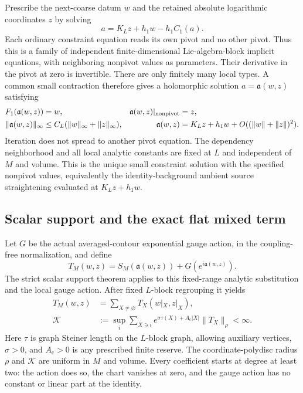 \documentclass[11pt]{article}
\theoremstyle{remark}
\begin{document}
Prescribe the next-coarse datum $w$ and the retained absolute logarithmic
coordinates $z$ by solving
\begin{equation}
 a=K_Lz+h_1w-h_1C_1(a).                                     \label{st-affine-equation}
\end{equation}
Each ordinary constraint equation reads its own pivot and no other
pivot. Thus this is a family of independent finite-dimensional
Lie-algebra-block implicit equations, with neighboring nonpivot values
as parameters. Their derivative in the pivot at zero is invertible.
There are only finitely many local types. A common small contraction
therefore gives a holomorphic solution $a=\mathfrak a(w,z)$ satisfying
\begin{align}
 F_1(\mathfrak a(w,z))&=w,&
 \mathfrak a(w,z)|_{\rm nonpivot}&=z,\notag\\
 \|\mathfrak a(w,z)\|_\infty
    &\le C_L(\|w\|_\infty+\|z\|_\infty),&
 \mathfrak a(w,z)&=K_Lz+h_1w+O((\|w\|+\|z\|)^2).
                                                               \label{st-affine-bounds}
\end{align}
Iteration does not spread to another pivot equation. The dependency
neighborhood and all local analytic constants are fixed at $L$ and
independent of $M$ and volume. This is the unique small constraint
solution with the specified nonpivot values, equivalently the
identity-background ambient source straightening evaluated at
$K_Lz+h_1w$.

\subsection{Scalar support and the exact flat mixed term}
\label{st-scalar-section}

Let $G$ be the actual averaged-contour exponential gauge action, in the
coupling-free normalization, and define
\begin{equation}
 T_M(w,z)=S_M(\mathfrak a(w,z))+G(e^{i\mathfrak a(w,z)}).
                                                               \label{st-action}
\end{equation}
The strict scalar support theorem applies to this fixed-range analytic
substitution and the local gauge action. After fixed $L$-block
regrouping it yields
\begin{align}
 T_M(w,z)&=\sum_{X\ne\varnothing}T_X(w|_X,z|_X),             \label{st-scalar-expansion}\\
 \mathcal K&:=\sup_i\sum_{X\ni i}
 e^{\sigma\tau(X)+A_{\mathrm c}|X|}\|T_X\|_\rho<\infty.         \label{st-scalar-norm}
\end{align}
Here $\tau$ is graph Steiner length on the $L$-block graph, allowing
auxiliary vertices, $\sigma>0$, and $A_{\mathrm c}>0$ is any prescribed
finite reserve. The coordinate-polydisc radius $\rho$ and $\mathcal K$
are uniform in $M$ and volume. Every coefficient starts at degree at
least two: the action does so, the chart vanishes at zero, and the gauge
action has no constant or linear part at the identity.
\end{document}
